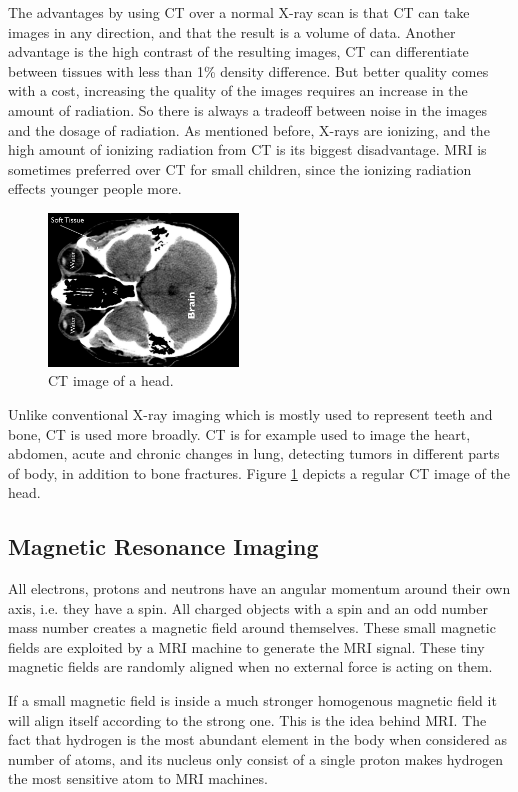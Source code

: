 The advantages by using CT over a normal X-ray scan is that CT can take images in any direction, and that the result is a volume of data. Another advantage is the high contrast of the resulting images, CT can differentiate between tissues with less than 1\% density difference. But better quality comes with a cost, increasing the quality of the images requires an increase in the amount of radiation. So there is always a tradeoff between noise in the images and the dosage of radiation. As mentioned before, X-rays are ionizing, and the high amount of ionizing radiation from CT is its biggest disadvantage. MRI is sometimes preferred over CT for small children, since the ionizing radiation effects younger people more.
\begin{figure}[h!]
\centering
\includegraphics[width=0.45\textwidth]{backgroundTheory/medicalImaging/CTimageRot}
\caption{CT image of a head.}
\label{CTimage}
\end{figure}
Unlike conventional X-ray imaging which is mostly used to represent teeth and bone, CT is used more broadly. CT is for example used to image the heart, abdomen, acute and chronic changes in lung, detecting tumors in different parts of body, in addition to bone fractures. Figure \ref{CTimage} depicts a regular CT image of the head.

\subsection{Magnetic Resonance Imaging}
All electrons, protons and neutrons have an angular momentum around their own axis, i.e. they have a spin. All charged objects with a spin and an odd number mass number creates a magnetic field around themselves. These small magnetic fields are exploited by a MRI machine to generate the MRI signal. These tiny magnetic fields are randomly aligned when no external force is acting on them.

If a small magnetic field is inside a much stronger homogenous magnetic field it will align itself according to the strong one. This is the idea behind MRI. The fact that hydrogen is the most abundant element in the body when considered as number of atoms, and its nucleus only consist of a single proton makes hydrogen the most sensitive atom to MRI machines. 

